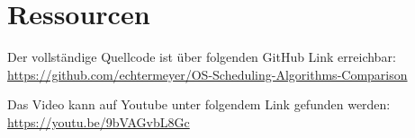 \chapter{Ressourcen}
Der vollständige Quellcode ist über folgenden GitHub Link erreichbar: \linebreak
\href{https://github.com/echtermeyer/OS-Scheduling-Algorithms-Comparison}{https://github.com/echtermeyer/OS-Scheduling-Algorithms-Comparison}

Das Video kann auf Youtube unter folgendem Link gefunden werden: \linebreak
\href{https://youtu.be/9bVAGvbL8Gc}{https://youtu.be/9bVAGvbL8Gc}
